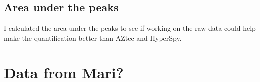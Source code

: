 \subsection{Area under the peaks}
\label{sec:method:treatment:area}
I calculated the area under the peaks to see if working on the raw data could help make the quantification better than AZtec and HyperSpy.


%
%
\section{Data from Mari?}
\label{sec:method:mar}
